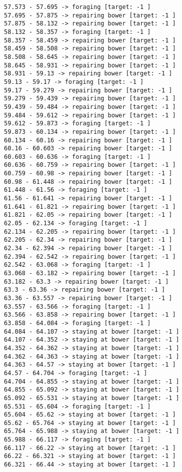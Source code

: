 \documentclass[11pt]{article}
\begin{document}
\begin{Verbatim}[commandchars=\\\{\}]
57.573 - 57.695 -> foraging [target: -1 ]
57.695 - 57.875 -> repairing bower [target: -1 ]
57.875 - 58.132 -> repairing bower [target: -1 ]
58.132 - 58.357 -> foraging [target: -1 ]
58.357 - 58.459 -> repairing bower [target: -1 ]
58.459 - 58.508 -> repairing bower [target: -1 ]
58.508 - 58.645 -> repairing bower [target: -1 ]
58.645 - 58.931 -> repairing bower [target: -1 ]
58.931 - 59.13 -> repairing bower [target: -1 ]
59.13 - 59.17 -> foraging [target: -1 ]
59.17 - 59.279 -> repairing bower [target: -1 ]
59.279 - 59.439 -> repairing bower [target: -1 ]
59.439 - 59.484 -> repairing bower [target: -1 ]
59.484 - 59.612 -> repairing bower [target: -1 ]
59.612 - 59.873 -> foraging [target: -1 ]
59.873 - 60.134 -> repairing bower [target: -1 ]
60.134 - 60.16 -> repairing bower [target: -1 ]
60.16 - 60.603 -> repairing bower [target: -1 ]
60.603 - 60.636 -> foraging [target: -1 ]
60.636 - 60.759 -> repairing bower [target: -1 ]
60.759 - 60.98 -> repairing bower [target: -1 ]
60.98 - 61.448 -> repairing bower [target: -1 ]
61.448 - 61.56 -> foraging [target: -1 ]
61.56 - 61.641 -> repairing bower [target: -1 ]
61.641 - 61.821 -> repairing bower [target: -1 ]
61.821 - 62.05 -> repairing bower [target: -1 ]
62.05 - 62.134 -> foraging [target: -1 ]
62.134 - 62.205 -> repairing bower [target: -1 ]
62.205 - 62.34 -> repairing bower [target: -1 ]
62.34 - 62.394 -> repairing bower [target: -1 ]
62.394 - 62.542 -> repairing bower [target: -1 ]
62.542 - 63.068 -> foraging [target: -1 ]
63.068 - 63.182 -> repairing bower [target: -1 ]
63.182 - 63.3 -> repairing bower [target: -1 ]
63.3 - 63.36 -> repairing bower [target: -1 ]
63.36 - 63.557 -> repairing bower [target: -1 ]
63.557 - 63.566 -> foraging [target: -1 ]
63.566 - 63.858 -> repairing bower [target: -1 ]
63.858 - 64.084 -> foraging [target: -1 ]
64.084 - 64.107 -> staying at bower [target: -1 ]
64.107 - 64.352 -> staying at bower [target: -1 ]
64.352 - 64.362 -> staying at bower [target: -1 ]
64.362 - 64.363 -> staying at bower [target: -1 ]
64.363 - 64.57 -> staying at bower [target: -1 ]
64.57 - 64.704 -> foraging [target: -1 ]
64.704 - 64.855 -> staying at bower [target: -1 ]
64.855 - 65.092 -> staying at bower [target: -1 ]
65.092 - 65.531 -> staying at bower [target: -1 ]
65.531 - 65.604 -> foraging [target: -1 ]
65.604 - 65.62 -> staying at bower [target: -1 ]
65.62 - 65.764 -> staying at bower [target: -1 ]
65.764 - 65.988 -> staying at bower [target: -1 ]
65.988 - 66.117 -> foraging [target: -1 ]
66.117 - 66.22 -> staying at bower [target: -1 ]
66.22 - 66.321 -> staying at bower [target: -1 ]
66.321 - 66.44 -> staying at bower [target: -1 ]

\end{Verbatim}
\end{document}
